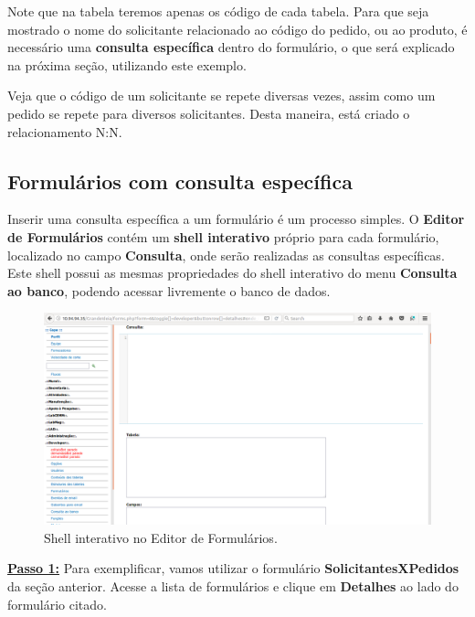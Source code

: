 \documentclass[9pt]{report}
\begin{document}
{       Note que na tabela teremos apenas os código de cada tabela.
       Para que seja mostrado o nome do solicitante relacionado ao
       código do pedido, ou ao produto, é necessário uma
       \textbf{consulta específica} dentro do formulário, o que será
       explicado na próxima seção, utilizando este exemplo.

       Veja que o código de um solicitante se repete diversas vezes,
       assim como um pedido se repete para diversos solicitantes.
       Desta maneira, está criado o relacionamento N:N.

      \subsection{Formulários com consulta específica}

      Inserir uma consulta específica a um formulário é um processo
      simples. O \textbf{Editor de Formulários} contém um
      \textbf{shell interativo} próprio para cada formulário,
      localizado no campo \textbf{Consulta},  onde serão realizadas
      as consultas específicas. Este shell possui as mesmas
      propriedades do shell interativo do menu
      \textbf{Consulta ao banco}, podendo acessar livremente o banco
      de dados.
      
      \begin{figure}[H]
        \includegraphics[width=\textwidth]{2_Formularios/5_Consulta_especifica/51.png}
        \caption{Shell interativo no Editor de Formulários.}
        \label{fig:shellconsulta}
      \end{figure}

      \underline{\textbf{Passo 1:}} Para exemplificar, vamos utilizar
      o formulário \textbf{SolicitantesXPedidos} da seção anterior.
      Acesse a lista de formulários e clique em \textbf{Detalhes} ao
      lado do formulário citado.
      
}
\end{document}

